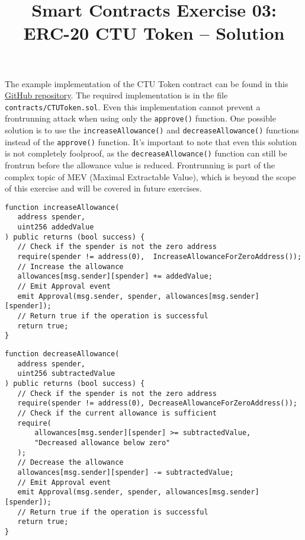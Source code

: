 \documentclass[12pt]{article}
\title{Smart Contracts Exercise 03: \\ ERC-20 CTU Token -- Solution}
\author{}
\date{}
\begin{document}
\maketitle

\noindent
The example implementation of the CTU Token contract can be found in this \href{https://github.com/radovluk/Smart-Contract-Exercise/tree/main/03-ERC20-CTUToken/solution/solution-code}{GitHub repository}. The required implementation is in the file \texttt{contracts/CTUToken.sol}. Even this implementation cannot prevent a frontrunning attack when using only the \texttt{approve()} function. One possible solution is to use the \texttt{increaseAllowance()} and \texttt{decreaseAllowance()} functions instead of the \texttt{approve()} function. It's important to note that even this solution is not completely foolproof, as the \texttt{decreaseAllowance()} function can still be frontrun before the allowance value is reduced. Frontrunning is part of the complex topic of MEV (Maximal Extractable Value), which is beyond the scope of this exercise and will be covered in future exercises.

\noindent
\begin{minipage}{\textwidth}
\begin{lstlisting}[language=Solidity]
function increaseAllowance(
   address spender,
   uint256 addedValue
) public returns (bool success) {
   // Check if the spender is not the zero address
   require(spender != address(0),  IncreaseAllowanceForZeroAddress());
   // Increase the allowance
   allowances[msg.sender][spender] += addedValue;
   // Emit Approval event
   emit Approval(msg.sender, spender, allowances[msg.sender][spender]);
   // Return true if the operation is successful
   return true;
}
\end{lstlisting}
\end{minipage}

\noindent
\begin{minipage}{\textwidth}
\begin{lstlisting}[language=Solidity]
function decreaseAllowance(
   address spender,
   uint256 subtractedValue
) public returns (bool success) {
   // Check if the spender is not the zero address
   require(spender != address(0), DecreaseAllowanceForZeroAddress());
   // Check if the current allowance is sufficient
   require(
       allowances[msg.sender][spender] >= subtractedValue,
       "Decreased allowance below zero"
   );
   // Decrease the allowance
   allowances[msg.sender][spender] -= subtractedValue;
   // Emit Approval event
   emit Approval(msg.sender, spender, allowances[msg.sender][spender]);
   // Return true if the operation is successful
   return true;
}
\end{lstlisting}
\end{minipage}
\end{document}
